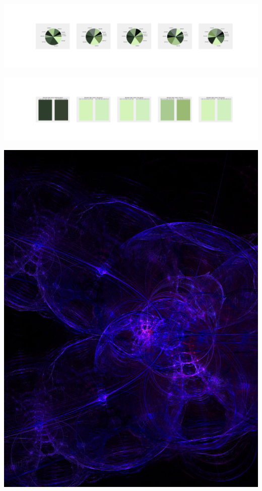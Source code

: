 \documentclass[11pt]{article}
\begin{document}
\begin{landscape}
    \begin{center}
    \includegraphics[width=250mm]{./nbimg/pie-439.jpg}
    \end{center}

    \begin{center}
    \includegraphics[width=250mm]{./nbimg/peak-439.jpg}
    \end{center}
    

    \begin{center}
    \includegraphics[width=\textwidth]{./nbimg/file (9).jpg}
    \end{center}


\end{landscape}
\end{document}
